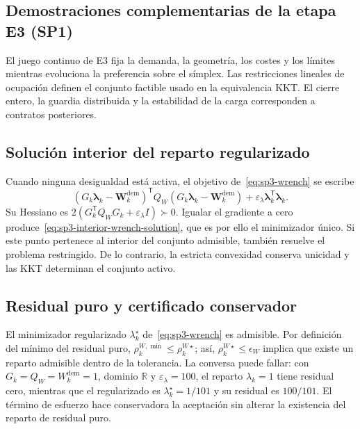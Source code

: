 \subsection{Demostraciones complementarias de la etapa E3 (SP1)}
\label{app:sp3-proofs}

El juego continuo de E3 fija la demanda, la geometría, los costes y los límites mientras evoluciona la preferencia sobre el símplex. Las restricciones lineales de ocupación definen el conjunto factible usado en la equivalencia KKT. El cierre entero, la guardia distribuida y la estabilidad de la carga corresponden a contratos posteriores.

\subsection{Solución interior del reparto regularizado}
\label{app:sp3-interior-wrench-proof}

Cuando ninguna desigualdad está activa, el objetivo de~\eqref{eq:sp3-wrench} se escribe
\[
 (G_k\boldsymbol\lambda_k-\boldsymbol W_k^{\mathrm{dem}})^{\mathsf T}
 Q_W(G_k\boldsymbol\lambda_k-\boldsymbol W_k^{\mathrm{dem}})
 +\varepsilon_\lambda\boldsymbol\lambda_k^{\mathsf T}\boldsymbol\lambda_k.
\]
Su Hessiano es $2(G_k^{\mathsf T}Q_WG_k+\varepsilon_\lambda I)\succ0$. Igualar el gradiente a cero produce~\eqref{eq:sp3-interior-wrench-solution}, que es por ello el minimizador único. Si este punto pertenece al interior del conjunto admisible, también resuelve el problema restringido. De lo contrario, la estricta convexidad conserva unicidad y las KKT determinan el conjunto activo.

\subsection{Residual puro y certificado conservador}
\label{app:sp3-residual-proof}

El minimizador regularizado $\lambda_k^\star$ de~\eqref{eq:sp3-wrench} es
admisible. Por definición del mínimo del residual puro,
$\rho_k^{W,\min}\leq\rho_k^{W\star}$; así,
$\rho_k^{W\star}\leq\epsilon_W$ implica que existe un reparto admisible
dentro de la tolerancia. La conversa puede fallar: con
$G_k=Q_W=W_k^{\mathrm{dem}}=1$, dominio $\mathbb R$ y
$\varepsilon_\lambda=100$, el reparto $\lambda_k=1$ tiene residual cero,
mientras que el regularizado es $\lambda_k^\star=1/101$ y su residual es
$100/101$. El término de esfuerzo hace conservadora la aceptación sin alterar
la existencia del reparto de residual puro.

